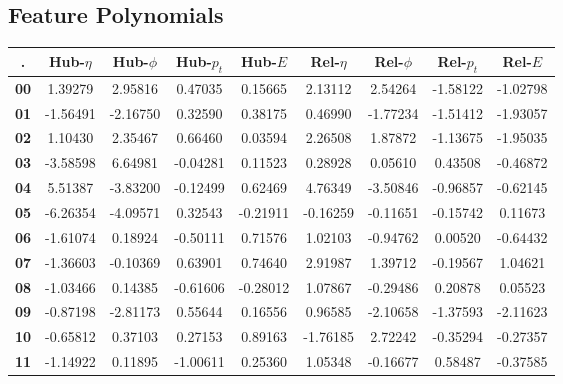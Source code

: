 \subsection{Feature Polynomials}

\begin{tabular}{|c|c|c|c|c|c|c|c|c|}
    \hline
    .           & \textbf{Hub-$\eta$} & \textbf{Hub-$\phi$} & \textbf{Hub-$p_t$} & \textbf{Hub-$E$} & \textbf{Rel-$\eta$} & \textbf{Rel-$\phi$} & \textbf{Rel-$p_t$} & \textbf{Rel-$E$} \\
    \hline
    \textbf{00} & 1.39279             & 2.95816             & 0.47035            & 0.15665          & 2.13112             & 2.54264             & -1.58122           & -1.02798         \\
    \textbf{01} & -1.56491            & -2.16750            & 0.32590            & 0.38175          & 0.46990             & -1.77234            & -1.51412           & -1.93057         \\
    \textbf{02} & 1.10430             & 2.35467             & 0.66460            & 0.03594          & 2.26508             & 1.87872             & -1.13675           & -1.95035         \\
    \textbf{03} & -3.58598            & 6.64981             & -0.04281           & 0.11523          & 0.28928             & 0.05610             & 0.43508            & -0.46872         \\
    \textbf{04} & 5.51387             & -3.83200            & -0.12499           & 0.62469          & 4.76349             & -3.50846            & -0.96857           & -0.62145         \\
    \textbf{05} & -6.26354            & -4.09571            & 0.32543            & -0.21911         & -0.16259            & -0.11651            & -0.15742           & 0.11673          \\
    \textbf{06} & -1.61074            & 0.18924             & -0.50111           & 0.71576          & 1.02103             & -0.94762            & 0.00520            & -0.64432         \\
    \textbf{07} & -1.36603            & -0.10369            & 0.63901            & 0.74640          & 2.91987             & 1.39712             & -0.19567           & 1.04621          \\
    \textbf{08} & -1.03466            & 0.14385             & -0.61606           & -0.28012         & 1.07867             & -0.29486            & 0.20878            & 0.05523          \\
    \textbf{09} & -0.87198            & -2.81173            & 0.55644            & 0.16556          & 0.96585             & -2.10658            & -1.37593           & -2.11623         \\
    \textbf{10} & -0.65812            & 0.37103             & 0.27153            & 0.89163          & -1.76185            & 2.72242             & -0.35294           & -0.27357         \\
    \textbf{11} & -1.14922            & 0.11895             & -1.00611           & 0.25360          & 1.05348             & -0.16677            & 0.58487            & -0.37585         \\
    \hline
\end{tabular}

